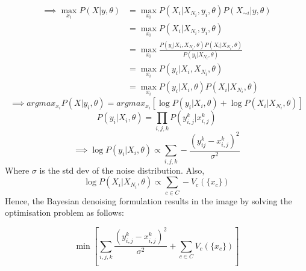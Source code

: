 \documentclass[11pt]{article}
\begin{document}
\begin{enumerate}
\begin{enumerate}
        \begin{align*}
            \implies \max_{x_i} P(X | y, \theta) &= \max_{x_i} P(X_i | X_{N_i}, y_i, \theta) P(X_{\sim i} | y, \theta)\\
            &= \max_{x_i} P(X_i | X_{N_i}, y_i, \theta)\\
            &= \max_{x_i} \frac{P (y_i | X_i, X_{N_i}, \theta) P(X_i | X_{N_i}, \theta)}{P (y_i | X_{N_i},\theta)}\\
            &= \max_{x_i} P (y_i | X_i, X_{N_i}, \theta) \\
            &= \max_{x_i} P(y_i | X_i, \theta) P(X_i | X_{N_i}, \theta)
        \end{align*}
        \begin{equation*}
            \implies argmax_{x_i} P(X|y_i, \theta) = argmax_{x_i} \left[\log P(y_i|X_i, \theta) + \log P(X_i | X_{N_i}, \theta)\right]
        \end{equation*}
        $$
            P(y_i | X_i, \theta) = \prod_{i,j,k} P(y_{i,j}^k | x_{i,j}^k) 
        $$
        $$
           \implies \log P(y_i | X_i, \theta) \propto \sum_{i,j,k} -\frac{(y_{ij}^k - x_{i,j}^k)^2}{\sigma^2}
        $$
        Where $\sigma$ is the std dev of the noise distribution.
        Also, 
        $$
        \log P(X_i | X_{N_i}, \theta) \propto \sum_{c \in C}- V_c(\{x_c\})
        $$
        Hence, the Bayesian denoising formulation results in the image by solving the optimisation problem as follows:
        
        $$
        \min \left[\sum_{i,j,k} \frac{(y_{i,j}^k - x_{i,j}^k)^2}{\sigma^2} + \sum_{c \in C} V_c(\{x_c\})\right]
        $$
        
        
    \end{enumerate}
\end{enumerate}
\end{document}
